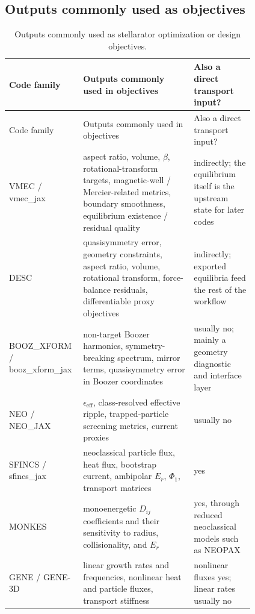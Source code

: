 \documentclass[11pt]{article}
\begin{document}
\subsection{Outputs commonly used as objectives}

{\small
\begin{longtable}{L{0.16\linewidth}L{0.42\linewidth}L{0.23\linewidth}}
\caption{Outputs commonly used as stellarator optimization or design objectives.}
\label{tab:objectives}\\
\toprule
Code family & Outputs commonly used in objectives & Also a direct transport input? \\
\midrule
\endfirsthead
\toprule
Code family & Outputs commonly used in objectives & Also a direct transport input? \\
\midrule
\endhead
VMEC / vmec\_jax &
aspect ratio, volume, \(\beta\), rotational-transform targets, magnetic-well /
Mercier-related metrics, boundary smoothness, equilibrium existence / residual
quality &
indirectly; the equilibrium itself is the upstream state for later codes \\

DESC &
quasisymmetry error, geometry constraints, aspect ratio, volume, rotational
transform, force-balance residuals, differentiable proxy objectives &
indirectly; exported equilibria feed the rest of the workflow \\

BOOZ\_XFORM / booz\_xform\_jax &
non-target Boozer harmonics, symmetry-breaking spectrum, mirror terms,
quasisymmetry error in Boozer coordinates &
usually no; mainly a geometry diagnostic and interface layer \\

NEO / NEO\_JAX &
\(\epsilon_{\mathrm{eff}}\), class-resolved effective ripple, trapped-particle
screening metrics, current proxies &
usually no \\

SFINCS / sfincs\_jax &
neoclassical particle flux, heat flux, bootstrap current, ambipolar
\(E_r\), \(\Phi_1\), transport matrices &
yes \\

MONKES &
monoenergetic \(D_{ij}\) coefficients and their sensitivity to radius,
collisionality, and \(E_r\) &
yes, through reduced neoclassical models such as NEOPAX \\

GENE / GENE-3D &
linear growth rates and frequencies, nonlinear heat and particle fluxes,
transport stiffness &
nonlinear fluxes yes; linear rates usually no \\


\end{longtable}}
\end{document}
